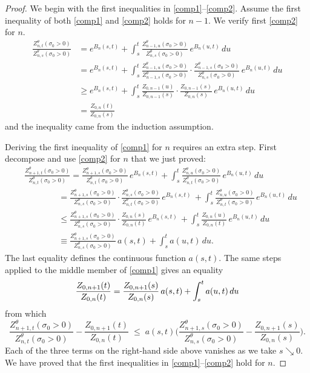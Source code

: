 \documentclass[11pt]{amsart}
\numberwithin{equation}{section}
\theoremstyle{remark}
\begin{document}
\begin{proof}
We begin with  the first inequalities in  \eqref{comp1}--\eqref{comp2}. 
 Assume the first inequality of both  \eqref{comp1} and \eqref{comp2} holds for $n-1$. 
We verify first \eqref{comp2} for $n$. 
\begin{align*}
\frac{Z_{n,t}^{\theta}(\sigma_0>0)}{Z_{n,s}^{\theta}(\sigma_0>0)}
&=  e^{B_n(s,t)} 
+ \int_s^t  \frac{Z_{n-1,u}^{\theta}(\sigma_0>0)}{Z_{n,s}^{\theta}(\sigma_0>0)} \,e^{B_n(u,t)} \,du\\
&=  e^{B_n(s,t)} 
+ \int_s^t  \frac{Z_{n-1,u}^{\theta}(\sigma_0>0)}{Z_{n-1,s}^{\theta}(\sigma_0>0)}
\cdot  \frac{Z_{n-1,s}^{\theta}(\sigma_0>0)}{Z_{n,s}^{\theta}(\sigma_0>0)} \,e^{B_n(u,t)} \,du\\
&\ge   e^{B_n(s,t)} 
+ \int_s^t  \frac{Z_{0,n-1}(u)}{Z_{0,n-1}(s)} 
\cdot  \frac{Z_{0,n-1}(s)}{Z_{0,n}(s)} \,e^{B_n(u,t)} \,du\\
&= \frac{Z_{0,n}(t)}{Z_{0, n}(s)}
\end{align*}
and the inequality came from the induction assumption. 

Deriving the first inequality of  \eqref{comp1} for $n$ requires an extra step.  First decompose and use 
 \eqref{comp2} for $n$ that we just proved:  
\begin{align*}
&\frac{Z_{n+1,t}^{\theta}(\sigma_0>0)}{Z_{n,t}^{\theta}(\sigma_0>0)} 
= \frac{Z_{n+1,s}^{\theta}(\sigma_0>0)}{Z_{n,t}^{\theta}(\sigma_0>0)}\,e^{B_n(s,t)} 
+ \int_s^t  \frac{Z_{n,u}^{\theta}(\sigma_0>0)}{Z_{n,t}^{\theta}(\sigma_0>0)} \,e^{B_n(u,t)} \,du\\[7pt]
&\qquad\qquad= \frac{Z_{n+1,s}^{\theta}(\sigma_0>0)}{Z_{n,s}^{\theta}(\sigma_0>0)} 
\cdot \frac{Z_{n,s}^{\theta}(\sigma_0>0)}{Z_{n,t}^{\theta}(\sigma_0>0)}\,e^{B_n(s,t)} \,
+ \int_s^t  \frac{Z_{n,u}^{\theta}(\sigma_0>0)}{Z_{n,t}^{\theta}(\sigma_0>0)} \,e^{B_n(u,t)} \,du\\
&\qquad\qquad\le  \frac{Z_{n+1,s}^{\theta}(\sigma_0>0)}{Z_{n,s}^{\theta}(\sigma_0>0)} 
\cdot \frac{Z_{0,n}(s)}{Z_{0,n}(t)}\,e^{B_n(s,t)} \,
+ \int_s^t  \frac{Z_{0,n}(u)}{Z_{0,n}(t)}  \,e^{B_n(u,t)} \,du\\
&\qquad\qquad\equiv \frac{Z_{n+1,s}^{\theta}(\sigma_0>0)}{Z_{n,s}^{\theta}(\sigma_0>0)} \,
a(s,t) + \int_s^t a(u,t)\,du. 
\end{align*}
The last equality defines the continuous function $a(s,t)$.  The same steps applied
to the middle member of  \eqref{comp1} gives an equality
\begin{equation} 
\frac{Z_{0,n+1}(t)}{Z_{0, n}(t)}  = \frac{Z_{0,n+1}(s)}{Z_{0, n}(s)}
\,a(s,t) + \int_s^t a(u,t)\,du \notag\end{equation}
from which 
\begin{equation}
\frac{Z_{n+1,t}^{\theta}(\sigma_0>0)}{Z_{n,t}^{\theta}(\sigma_0>0)}  -  \frac{Z_{0,n+1}(t)}{Z_{0, n}(t)} 
\; \le \; a(s,t) \biggl( \frac{Z_{n+1,s}^{\theta}(\sigma_0>0)}{Z_{n,s}^{\theta}(\sigma_0>0)} 
- \frac{Z_{0,n+1}(s)}{Z_{0, n}(s)}\biggr).   \label{compaux8}\end{equation}
Each of the three terms on the right-hand side above vanishes as we take $s\searrow 0$.  We have proved that the  first inequalities in  \eqref{comp1}--\eqref{comp2}  hold for $n$. 


\end{proof}
\end{document}
